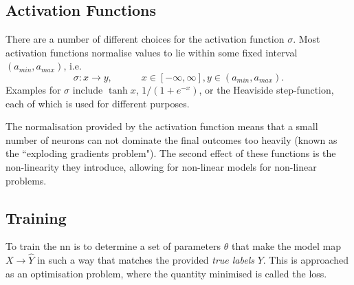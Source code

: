 
        \subsection{Activation Functions \label{ssec: activation function}}

        There are a number of different choices for the activation function $\sigma$. Most activation functions normalise values to lie within some fixed interval $(a_{min}, a_{max})$, i.e.
        \begin{equation}
        \sigma : x \rightarrow y, \hspace{3em} x \in [-\infty, \infty], y \in (a_{min}, a_{max}).
        \end{equation}
        Examples for $\sigma$ include $\tanh{x}$, $1/(1 + e^{-x})$, or the Heaviside step-function, each of which is used for different purposes.

        The normalisation provided by the activation function means that a small number of \glspl{neuron} can not dominate the final outcomes too heavily (known as the ``exploding gradients problem"). The second effect of these functions is the non-linearity they introduce, allowing for non-linear \glspl{model} for non-linear problems\cite{mlTextbook}.

    \subsection{Training \label{ssec: training}}
        To train the \gls{nn} is to determine a set of parameters $\theta$ that make the \gls{model} map $X \rightarrow \hat{Y}$ in such a way that matches the provided \textit{true labels} $Y$. This is approached as an optimisation problem, where the quantity minimised is called the loss\cite{mlTextbook}.

